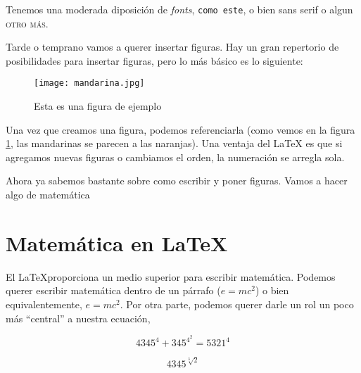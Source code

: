 \documentclass[11pt,a4paper]{article} %
\begin{document}
\vspace{5mm}

Tenemos una moderada diposici\'on de \textit{fonts}, \texttt{como este}, o bien \textsf{sans serif} o algun \textsc{otro m\'as}.

\vspace{5mm}

Tarde o temprano vamos a querer insertar figuras. Hay un gran repertorio de posibilidades para insertar figuras, pero lo m\'as b\'asico es lo siguiente:

\begin{figure}[h]%
\centering
\texttt{[image: mandarina.jpg]}   %
\caption{\small  Esta es una figura de ejemplo }
\label{mandarina}
\end{figure}
Una vez que creamos una figura, podemos referenciarla (como vemos en la figura \ref{mandarina}, las mandarinas se parecen a las naranjas). Una ventaja del \LaTeX{} es que si agregamos nuevas figuras o cambiamos el orden, la numeraci\'on se arregla sola.

Ahora ya sabemos bastante sobre como escribir y poner figuras. Vamos a hacer algo de matem\'atica

\clearpage  %

\section{Matem\'atica en \LaTeX{} }

El \LaTeX proporciona un medio superior para escribir matem\'atica. Podemos querer escribir matem\'atica dentro de un p\'arrafo ($e=mc^{2}$) o bien equivalentemente, \begin{math} e = mc^{2} \end{math}. Por otra parte, podemos querer darle un rol un poco m\'as ``central'' a nuestra ecuaci\'on,

\begin{displaymath}
4345^{4} + 345^{4^2} = 5321^{4}
\end{displaymath}

$$4345^{\sqrt[3]{2}}$$ %
\end{document}
